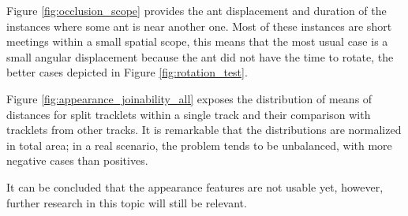 {
    Figure \ref{fig:occlusion_scope} provides the ant displacement and duration of the instances where some ant is near another one.
    Most of these instances are short meetings within a small spatial scope, 
    this means that the most usual case is a small angular displacement because the ant did not have the time to rotate, 
    the better cases depicted in Figure \ref{fig:rotation_test}.
}

{
    Figure \ref{fig:appearance_joinability_all} exposes the distribution of means of distances for split tracklets within a single track and their comparison with tracklets from other tracks. 
    It is remarkable that the distributions are normalized in total area; in a real scenario, the problem tends to be unbalanced, with more negative cases than positives.   
}

\enlargethispage{1\baselineskip}

{
    It can be concluded that the appearance features are not usable yet, however, further research in this topic will still be relevant.
}

